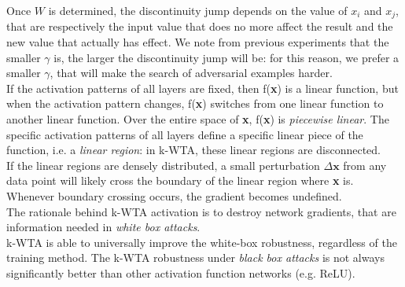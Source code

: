 \documentclass[a4paper]{article}
\begin{document}
Once $W$ is determined, the discontinuity jump depends on the value of $x_i$ and $x_j$, that are respectively the input value that does no more affect the result and the new value that actually has effect. We note from previous experiments that the smaller $\gamma$ is, the larger the discontinuity jump will be: for this reason, we prefer a smaller $\gamma$, that will make the search of adversarial examples harder.\\
If the activation patterns of all layers are fixed, then f(\textbf{x}) is a linear function, but when the activation pattern changes, f(\textbf{x}) switches from one linear function to another linear function. Over the entire space of \textbf{x}, f(\textbf{x}) is \emph{piecewise linear}. The specific activation patterns of all layers define a specific linear piece of the function, i.e. a \emph{linear region}: in k-WTA, these linear regions are disconnected.\\
If the linear regions are densely distributed, a small perturbation $\Delta\textbf{x}$ from any data point will likely cross the boundary of the linear region where \textbf{x} is. Whenever boundary crossing occurs, the gradient becomes undefined.\\
The rationale behind k-WTA activation is to destroy network gradients, that are information needed in \emph{white box attacks}.\\
k-WTA is able to universally improve the white-box robustness, regardless of the training method. The k-WTA robustness under \emph{black box attacks} is not always significantly better than other activation function networks (e.g. ReLU).
 

	
\end{document}

